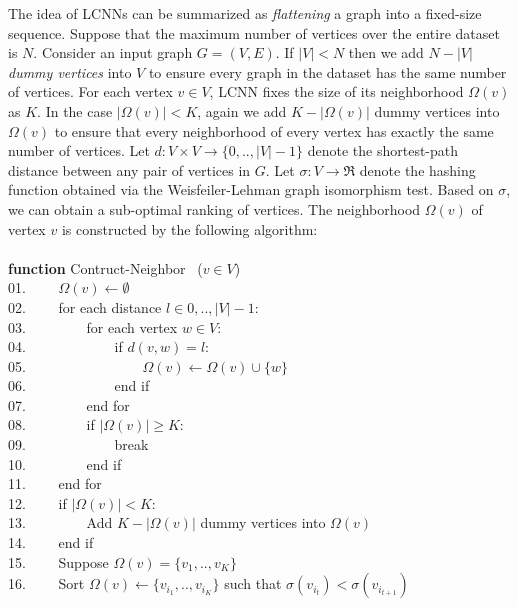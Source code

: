 \documentclass[a4paper]{article}
\begin{document}
The idea of LCNNs can be summarized as \textit{flattening} a graph into a fixed-size sequence. Suppose that the maximum number of vertices over the entire dataset is $N$. Consider an input graph $G = (V, E)$. If $|V| < N$ then we add $N - |V|$ \textit{dummy vertices} into $V$ to ensure every graph in the dataset has the same number of vertices. For each vertex $v \in V$, LCNN fixes the size of its neighborhood $\Omega(v)$ as $K$. In the case $|\Omega(v)| < K$, again we add $K - |\Omega(v)|$ dummy vertices into $\Omega(v)$ to ensure that every neighborhood of every vertex has exactly the same number of vertices. Let $d: V \times V \rightarrow \{0, .., |V| - 1\}$ denote the shortest-path distance between any pair of vertices in $G$. Let $\sigma: V \rightarrow \Re$ denote the hashing function obtained via the Weisfeiler-Lehman graph isomorphism test. Based on $\sigma$, we can obtain a sub-optimal ranking of vertices. The neighborhood $\Omega(v)$ of vertex $v$ is constructed by the following algorithm: \\ \\
\textbf{function} Contruct-Neighbor \ ($v \in V$) \\
01. \ \ \ \ $\Omega(v) \leftarrow \emptyset$ \\
02. \ \ \ \ for each distance $l \in {0, .., |V| - 1}$: \\
03. \ \ \ \ \ \ \ \ for each vertex $w \in V$: \\
04. \ \ \ \ \ \ \ \ \ \ \ \ if $d(v, w) = l$: \\
05. \ \ \ \ \ \ \ \ \ \ \ \ \ \ \ \ $\Omega(v) \leftarrow \Omega(v) \cup \{w\}$ \\
06. \ \ \ \ \ \ \ \ \ \ \ \ end if \\
07. \ \ \ \ \ \ \ \ end for \\
08. \ \ \ \ \ \ \ \ if $|\Omega(v)| \ge K$: \\
09. \ \ \ \ \ \ \ \ \ \ \ \ break \\
10. \ \ \ \ \ \ \ \ end if \\
11. \ \ \ \ end for \\
12. \ \ \ \ if $|\Omega(v)| < K$: \\
13. \ \ \ \ \ \ \ \ Add $K - |\Omega(v)|$ dummy vertices into $\Omega(v)$ \\
14. \ \ \ \ end if \\
15. \ \ \ \ Suppose $\Omega(v) = \{v_1, .., v_K\}$ \\
16. \ \ \ \ Sort $\Omega(v) \leftarrow \{v_{i_1}, .., v_{i_K}\}$ such that $\sigma(v_{i_t}) < \sigma(v_{i_{t + 1}})$ \\
\end{document}
